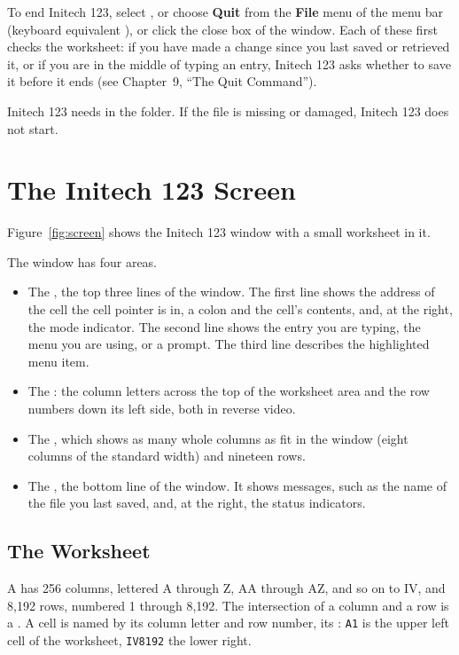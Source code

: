 To end Initech 123, select , or choose \textbf{Quit}
from the \textbf{File} menu of the menu bar (keyboard equivalent
), or click the close box of the window.  Each of these first
checks the worksheet: if you have made a change since you last saved or
retrieved it, or if you are in the middle of typing an entry, Initech 123
asks whether to save it before it ends (see Chapter~9, ``The Quit
Command'').

\begin{Note}
Initech 123 needs  in the  folder.  If the file is
missing or damaged, Initech 123 does not start.
\end{Note}

\section{The Initech 123 Screen}
Figure~\ref{fig:screen} shows the Initech 123 window with a small
worksheet in it.


The window has four areas.
\begin{itemize}
\item The , the top three lines of the window.  The
  first line shows the address of the cell the cell pointer is in, a colon
  and the cell's contents, and, at the right, the mode indicator.  The
  second line shows the entry you are typing, the menu you are using, or a
  prompt.  The third line describes the highlighted menu item.
\item The : the column letters across the top of the
  worksheet area and the row numbers down its left side, both in reverse
  video.
\item The , which shows as many whole columns as fit
  in the window (eight columns of the standard width) and nineteen rows.
\item The , the bottom line of the window.  It shows
  messages, such as the name of the file you last saved, and, at the right,
  the status indicators.
\end{itemize}

\subsection{The Worksheet}
A  has 256 columns, lettered A through Z, AA through AZ, and
so on to IV, and 8,192 rows, numbered 1 through 8,192.  The intersection of a
column and a row is a .  A cell is named by its column letter
and row number, its : \texttt{A1} is the upper left cell of
the worksheet, \texttt{IV8192} the lower right.

